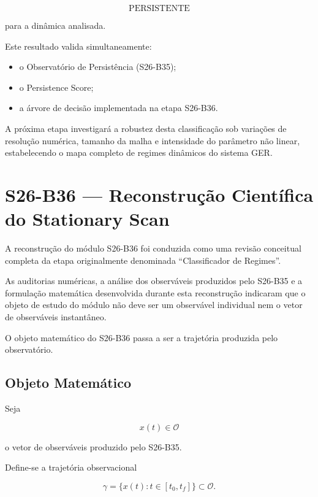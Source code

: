 \documentclass[11pt,a4paper]{article}
\begin{document}
\[
\boxed{\text{PERSISTENTE}}
\]

para a dinâmica analisada.

Este resultado valida simultaneamente:

\begin{itemize}

\item
o Observatório de Persistência (S26-B35);

\item
o Persistence Score;

\item
a árvore de decisão implementada na etapa S26-B36.

\end{itemize}

A próxima etapa investigará a robustez desta classificação sob
variações de resolução numérica, tamanho da malha e intensidade do
parâmetro não linear, estabelecendo o mapa completo de regimes
dinâmicos do sistema GER.

\section{S26-B36 — Reconstrução Científica do Stationary Scan}

A reconstrução do módulo S26-B36 foi conduzida como uma revisão conceitual completa da
etapa originalmente denominada ``Classificador de Regimes''.

As auditorias numéricas, a análise dos observáveis produzidos pelo S26-B35 e a formulação
matemática desenvolvida durante esta reconstrução indicaram que o objeto de estudo do
módulo não deve ser um observável individual nem o vetor de observáveis instantâneo.

O objeto matemático do S26-B36 passa a ser a trajetória produzida pelo observatório.

\subsection{Objeto Matemático}

Seja

\[
x(t)\in\mathcal O
\]

o vetor de observáveis produzido pelo S26-B35.

Define-se a trajetória observacional

\[
\gamma=\{x(t):t\in[t_0,t_f]\}\subset\mathcal O.
\]
\end{document}
